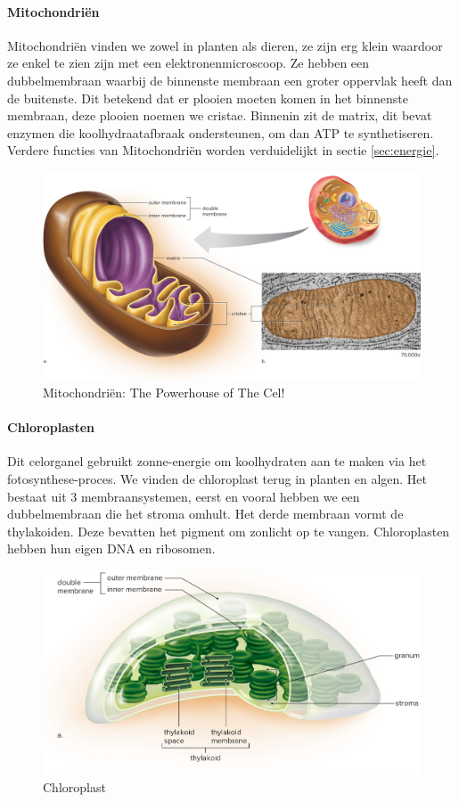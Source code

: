 \documentclass[a4paper,kul]{kulakarticle} %
\begin{document}
\paragraph{Mitochondriën}
Mitochondriën vinden we zowel in planten als dieren, ze zijn erg klein waardoor ze enkel te zien zijn met een elektronenmicroscoop. Ze hebben een dubbelmembraan waarbij de binnenste membraan een groter oppervlak heeft dan de buitenste. Dit betekend dat er plooien moeten komen in het binnenste membraan, deze plooien noemen we cristae. Binnenin zit de matrix, dit bevat enzymen die koolhydraatafbraak ondersteunen, om dan ATP te synthetiseren. Verdere functies van Mitochondriën worden verduidelijkt in sectie \ref{sec:energie}.
\begin{figure}[h!]
	\centering
	\includegraphics[width=0.7\linewidth]{PowerhouseOfTheCell}
	\caption[Mitochondria]{Mitochondriën: The Powerhouse of The Cel!}
	\label{fig:powerhouseofthecell}
\end{figure}
\paragraph{Chloroplasten}
Dit celorganel gebruikt zonne-energie om koolhydraten aan te maken via het fotosynthese-proces. We vinden de chloroplast terug in planten en algen. Het bestaat uit 3 membraansystemen, eerst en vooral hebben we een dubbelmembraan die het stroma omhult. Het derde membraan vormt de thylakoiden. Deze bevatten het pigment om zonlicht op te vangen. Chloroplasten hebben hun eigen DNA en ribosomen.  
\begin{figure}[h]
	\centering
	\includegraphics[width=0.7\linewidth]{Chloroplast}
	\caption[Chloroplast]{Chloroplast}
	\label{fig:chloroplast}
\end{figure}
\newpage
\end{document}
